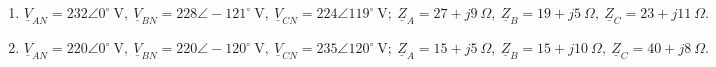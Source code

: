 \documentclass[../main]{subfiles}
\begin{document}
\begin{enumerate}
\item $\underline{V}_{AN}=232\angle 0^\circ\ \text{V},\ \underline{V}_{BN}=228\angle -121^\circ\ \text{V},\ \underline{V}_{CN}=224\angle 119^\circ\ \text{V};\ \underline{Z}_A=27+j9\ \Omega,\ \underline{Z}_B=19+j5\ \Omega,\ \underline{Z}_C=23+j11\ \Omega.$

\item $\underline{V}_{AN}=220\angle 0^\circ\ \text{V},\ \underline{V}_{BN}=220\angle -120^\circ\ \text{V},\ \underline{V}_{CN}=235\angle 120^\circ\ \text{V};\ \underline{Z}_A=15+j5\ \Omega,\ \underline{Z}_B=15+j10\ \Omega,\ \underline{Z}_C=40+j8\ \Omega.$
\end{enumerate}
\end{document}
